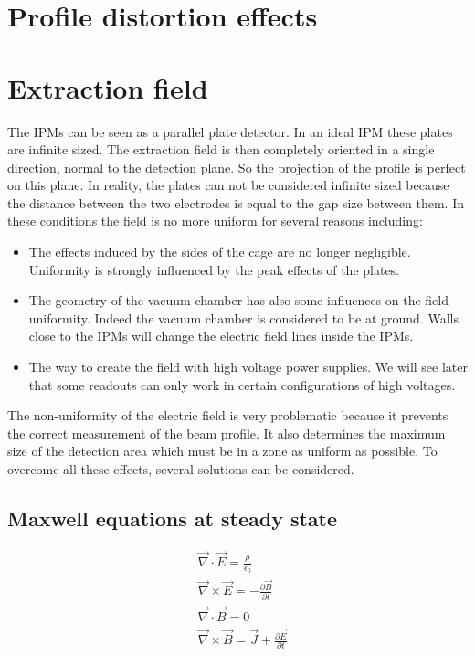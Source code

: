 \begin{refsection}
	\section{Profile distortion effects}

  \section{Extraction field}
  The IPMs can be seen as a parallel plate detector. In an ideal IPM these plates are infinite sized. The extraction field is then completely oriented in a single direction, normal to the detection plane. So the projection of the profile is perfect on this plane. In reality, the plates can not be considered infinite sized because the distance between the two electrodes is equal to the gap size between them. In these conditions the field is no more uniform for several reasons including:
  \begin{itemize}
    \item The effects induced by the sides of the cage are no longer negligible. Uniformity is strongly influenced by the peak effects of the plates.
    \item The geometry of the vacuum chamber has also some influences on the field uniformity. Indeed the vacuum chamber is considered to be at ground. Walls close to the IPMs will change the electric field lines inside the IPMs.
    \item The way to create the field with high voltage power supplies. We will see later that some readouts can only work in certain configurations of high voltages.
  \end{itemize}
  The non-uniformity of the electric field is very problematic because it prevents the correct measurement of the beam profile. It also determines the maximum size of the detection area which must be in a zone as uniform as possible. To overcome all these effects, several solutions can be considered. 

	\subsection{Maxwell equations at steady state}
	\begin{align}
		 & \overrightarrow{\nabla} \cdot \overrightarrow{E} = \frac{\rho}{\epsilon_{0}}                                            \\
		 & \overrightarrow{\nabla} \times \overrightarrow{E} = - \frac{\partial \overrightarrow{B}}{\partial t}                    \\
		 & \overrightarrow{\nabla} \cdot \overrightarrow{B} = 0                                                                    \\
		 & \overrightarrow{\nabla} \times \overrightarrow{B} = \overrightarrow{J} + \frac{\partial \overrightarrow{E}}{\partial t}
	\end{align}


\end{refsection}
